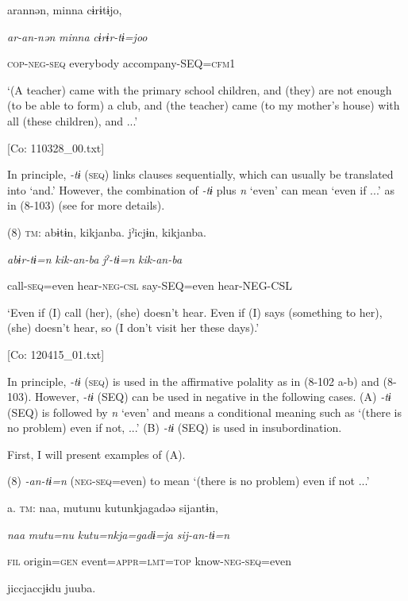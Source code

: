       arannən,  minna  cɨrɨtɨjo,

      \textit{ar-an-nən}  \textit{minna}  \textit{cɨrɨr-tɨ=joo}

      \textsc{cop}-\textsc{neg}-\textsc{seq}  everybody  accompany-SEQ=\textsc{cfm}1

      ‘(A teacher) came with the primary school children, and (they) are not enough (to be able to form) a club, and (the teacher) came (to my mother’s house) with all (these children), and ...’

      [Co: 110328\_00.txt]

In principle, \textit{{}-tɨ} (\textsc{seq}) links clauses sequentially, which can usually be translated into ‘and.’ However, the combination of \textit{{}-tɨ} plus \textit{n} ‘even’ can mean ‘even if ...’ as in (8-103) (see  for more details).

(8)  \textsc{tm}:  abɨtɨn,  kikjanba.  jˀicjɨn,  kikjanba.

    \textit{abɨr-tɨ=n}  \textit{kik-an-ba}  \textit{jˀ-tɨ=n}  \textit{kik-an-ba}

    call-\textsc{seq}=even  hear-\textsc{neg}-\textsc{csl}  say-SEQ=even  hear-NEG-CSL

    ‘Even if (I) call (her), (she) doesn’t hear. Even if (I) says (something to her), (she) doesn’t hear, so (I don’t visit her these days).’

    [Co: 120415\_01.txt]

In principle, \textit{{}-tɨ} (\textsc{seq}) is used in the affirmative polality as in (8-102 a-b) and (8-103). However, \textit{{}-tɨ} (SEQ) can be used in negative in the following cases. (A) \textit{{}-tɨ} (SEQ) is followed by \textit{n} ‘even’ and means a conditional meaning such as ‘(there is no problem) even if not, ...’ (B) \textit{{}-tɨ} (SEQ) is used in insubordination.

First, I will present examples of (A).

(8)  \textit{{}-an-tɨ=n} (\textsc{neg}-\textsc{seq}=even) to mean ‘(there is no problem) even if not ...’

  a.  \textsc{tm}:  naa,  mutunu  kutunkjagadəə  sijantɨn,

      \textit{naa}  \textit{mutu=nu}  \textit{kutu=nkja=gadɨ=ja}  \textit{sij-an-tɨ=n}

      \textsc{fil}  origin=\textsc{gen}  event=\textsc{appr}=\textsc{lmt}=\textsc{top}  know-\textsc{neg}-\textsc{seq}=even

      jiccjaccjɨdu  juuba.

